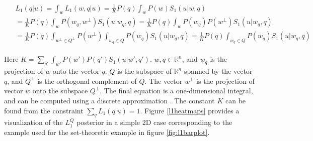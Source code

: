 \documentclass[OpenMind]{stjour}
\newcommand{\Listener}{L}
\newcommand{\QLONE}{\Listener_{{1}}^{{Q}}}
\begin{document}



















	 \begin{align}
	 \begin{split}
	&L_1(q | u) = \int_{w}L_1(w,q | u)
	= \frac{1}{K}P(q) \int_{w}P(w)S_1(u|w,q)  \\
	&= \frac{1}{K}P(q) \int_{w}P(w_q, w^\bot)S_1(u|w_q,q) 
	= \frac{1}{K}P(q) \int_{w}P(w_q) P(w^\bot)S_1(u|w_q,q) \\
	&= \frac{1}{K}P(q) \int_{w^\bot \in Q^\bot}P(w^\bot)  \int_{w_q \in Q}P(w_q) S_1(u|w_q,q)
	= \frac{1}{K}P(q)  \int_{w_q \in Q}P(w_q) S_1(u|w_q,q) \nonumber
	\end{split}
	 \end{align}
	



	Here $K = \sum_{q'} \int_{w'} P(w')P(q')S_1(u|w',q')$. $w, q\in \mathbb{R}^n$, and $w_q$ is the projection of $w$ onto the vector $q$. $Q$ is the subspace of $\mathbb{R}^n$ spanned by the vector $q$, and $Q^\bot$ is the orthogonal complement of $Q$. The vector $w^\bot$ is the projection of vector $w$ onto the subspace $Q^\bot$. The final equation is a one-dimensional integral, and can be computed using a discrete approximation . The constant $K$ can be found from the constraint $\sum_q L_1(q|u) = 1$. Figure \ref{l1heatmaps} provides a visualization of the $\QLONE$ posterior in a simple 2D case corresponding to the example used for the set-theoretic example in figure \ref{fig:l1barplot}.


\end{document}
